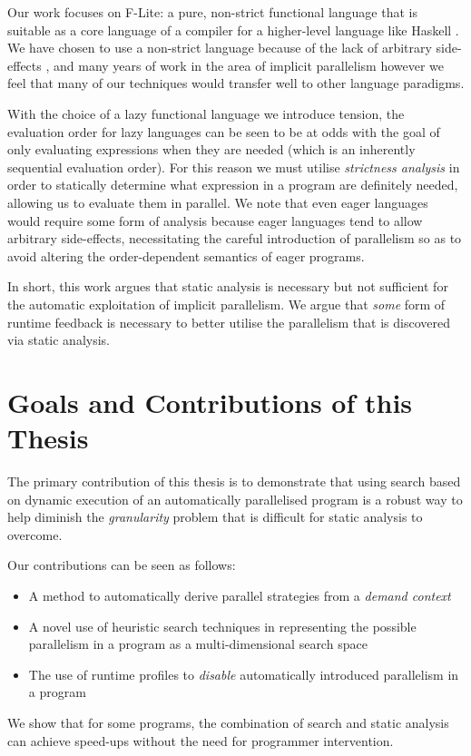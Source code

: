 Our work focuses on F-Lite: a pure, non-strict functional language that is
suitable as a core language of a compiler for a higher-level language like
Haskell \citep{naylor2010reduceron}. We have chosen to use a non-strict language
because of the lack of arbitrary side-effects \citep{whyFPmatters}, and many
years of work in the area of implicit parallelism \citep{hogen1992automatic,
PFPAnIntro, jones1993implicit} however we feel that many of our techniques
would transfer well to other language paradigms.

With the choice of a lazy functional language we introduce tension, the
evaluation order for lazy languages can be seen to be at odds with the goal of
only evaluating expressions when they are needed (which is an inherently
sequential evaluation order). For this reason we must utilise \emph{strictness
analysis} in order to statically determine what expression in a program are
definitely needed, allowing us to evaluate them in parallel. We note that even
eager languages would require some form of analysis because eager languages
tend to allow arbitrary side-effects, necessitating the careful introduction of
parallelism so as to avoid altering the order-dependent semantics of eager
programs.

In short, this work argues that static analysis is necessary but not sufficient
for the automatic exploitation of implicit parallelism. We argue that
\emph{some} form of runtime feedback is necessary to better utilise the
parallelism that is discovered via static analysis.

\section{Goals and Contributions of this Thesis}

The primary contribution of this thesis is to demonstrate that using search
based on dynamic execution of an automatically parallelised program is a robust
way to help diminish the \emph{granularity} problem that is difficult for
static analysis to overcome.

Our contributions can be seen as follows:

\begin{itemize}
    \item A method to automatically derive parallel strategies from a
            \emph{demand context}
    \item A novel use of heuristic search techniques in representing the
            possible parallelism in a program as a multi-dimensional search space
    \item The use of runtime profiles to \emph{disable} automatically introduced
            parallelism in a program
\end{itemize}

We show that for some programs, the combination of search and static analysis
can achieve speed-ups without the need for programmer intervention.

